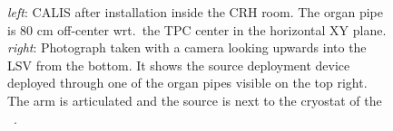 \begin{figure}[htbp]
 \centering
{}
\caption{\textit{left}: CALIS after installation inside the CRH room. The organ pipe is 80 cm off-center wrt.~the TPC center in the horizontal XY plane. \textit{right}: Photograph taken with a camera looking upwards into the LSV from the bottom. It shows the source deployment device deployed through one of the organ pipes visible on the top right. The arm is articulated and the source is next to the cryostat of the \lar\ \tpc.
\label{fig:CALIS_photos}}
\end{figure}







